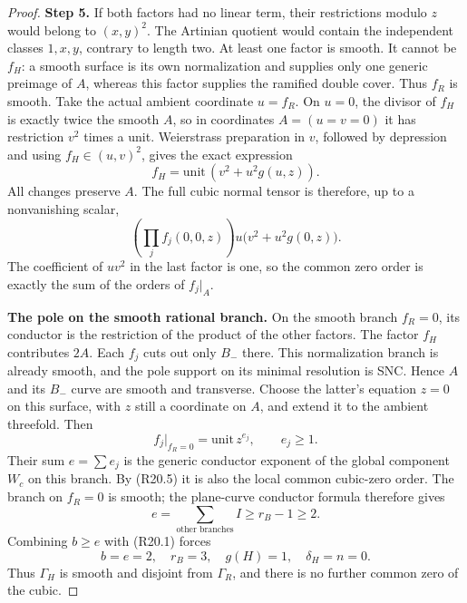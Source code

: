 \begin{proof}
\noindent\textbf{Step 5.} If both factors had no linear term, their
restrictions modulo $z$ would belong to
$(x,y)^2$. The Artinian quotient would contain
the independent classes $1,x,y$, contrary to
length two. At least one factor is smooth.
It cannot be $f_H$: a smooth surface is its own
normalization and supplies only one generic
preimage of $A$, whereas this factor supplies
the ramified double cover. Thus $f_R$ is smooth.
Take the actual ambient coordinate $u=f_R$.
On $u=0$, the divisor of $f_H$ is exactly twice
the smooth $A$, so in coordinates
$A=(u=v=0)$ it has restriction $v^2$ times a
unit. Weierstrass preparation in $v$, followed
by depression and using $f_H\in(u,v)^2$, gives
the exact expression
\[
                    f_H=\text{unit}\,(v^2+u^2g(u,z)).     \tag{R20.4}
\]
All changes preserve $A$. The full cubic normal
tensor is therefore, up to a nonvanishing scalar,
\[
        \left(\prod_j f_j(0,0,z)\right)
                     u\bigl(v^2+u^2g(0,z)\bigr).          \tag{R20.5}
\]
The coefficient of $uv^2$ in the last factor is
one, so the common zero order is exactly the
sum of the orders of $f_j|_A$.

\par\medskip\noindent\textbf{The pole on the smooth rational branch.}
On the smooth branch $f_R=0$, its conductor is
the restriction of the product of the other
factors. The factor $f_H$ contributes $2A$.
Each $f_j$ cuts out only $B_-$ there. This
normalization branch is already smooth, and
the pole support on its minimal resolution is
SNC. Hence $A$ and its $B_-$ curve are smooth
and transverse. Choose the latter's equation
$z=0$ on this surface, with $z$ still a
coordinate on $A$, and extend it to the ambient
threefold. Then
\[
             f_j|_{f_R=0}=\text{unit}\,z^{e_j},
                  \qquad e_j\ge1.
\]
Their sum $e=\sum e_j$ is the generic conductor
exponent of the global component $W_c$ on
this branch. By (R20.5) it is also the local
common cubic-zero order. The branch on
$f_R=0$ is smooth; the plane-curve conductor
formula therefore gives
\[
          e=\sum_{\text{other branches}}I
                         \ge r_B-1\ge2.
\]
Combining $b\ge e$ with (R20.1) forces
\[
     b=e=2,\quad r_B=3,\quad
     g(H)=1,\quad \delta_H=n=0.                         \tag{R20.6}
\]
Thus $\Gamma_H$ is smooth and disjoint from
$\Gamma_R$, and there is no further common
zero of the cubic.


\end{proof}
